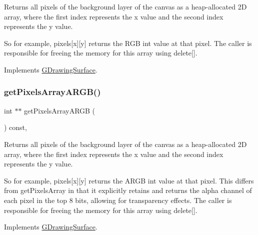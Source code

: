 Returns all pixels of the background layer of the canvas as a heap-\/allocated 2D array, where the first index represents the x value and the second index represents the y value. 

So for example, pixels\mbox{[}x\mbox{]}\mbox{[}y\mbox{]} returns the R\+GB int value at that pixel. The caller is responsible for freeing the memory for this array using delete\mbox{[}\mbox{]}. 

Implements \mbox{\hyperlink{classsgl_1_1GDrawingSurface_ab42bd04a0a8ad87ec0c7e9856e4da3ac}{G\+Drawing\+Surface}}.

\mbox{\label{classsgl_1_1GCanvas_a32164dac42ec2253f2c92a27ad98af74}} 
\subsubsection{\texorpdfstring{get\+Pixels\+Array\+A\+R\+G\+B()}{getPixelsArrayARGB()}}
{\footnotesize\ttfamily int $\ast$$\ast$ get\+Pixels\+Array\+A\+R\+GB (\begin{DoxyParamCaption}{ }\end{DoxyParamCaption}) const\hspace{0.3cm}{\ttfamily [override]}, {\ttfamily [virtual]}}



Returns all pixels of the background layer of the canvas as a heap-\/allocated 2D array, where the first index represents the x value and the second index represents the y value. 

So for example, pixels\mbox{[}x\mbox{]}\mbox{[}y\mbox{]} returns the A\+R\+GB int value at that pixel. This differs from get\+Pixels\+Array in that it explicitly retains and returns the alpha channel of each pixel in the top 8 bits, allowing for transparency effects. The caller is responsible for freeing the memory for this array using delete\mbox{[}\mbox{]}. 

Implements \mbox{\hyperlink{classsgl_1_1GDrawingSurface_a5bd493d4580fad7e9ebd97871c959276}{G\+Drawing\+Surface}}.

\mbox{\label{classsgl_1_1GDrawingSurface_a8da04ef488ec5fa498fbbffaf50928fd}} 
